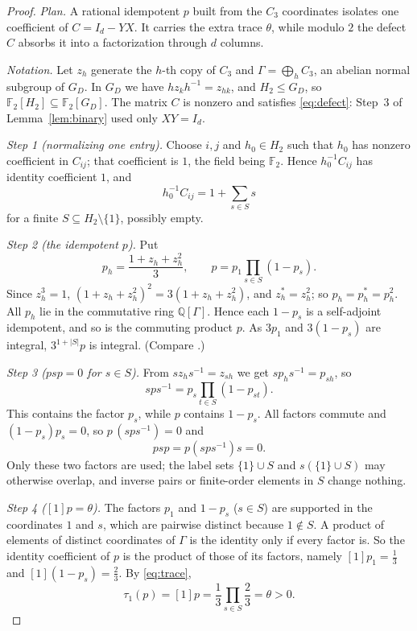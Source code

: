 \documentclass[11pt]{article}
\theoremstyle{remark}
\numberwithin{equation}{section}
\newcommand{\F}{\mathbb F}
\newcommand{\Q}{\mathbb Q}
\begin{document}
\begin{proof}
\emph{Plan.} A rational idempotent $p$ built from the $C_3$ coordinates isolates one coefficient of $C=I_d-YX$. It carries the extra trace $\theta$, while modulo $2$ the defect $C$ absorbs it into a factorization through $d$ columns.

\emph{Notation.} Let $z_h$ generate the $h$-th copy of $C_3$ and $\Gamma=\bigoplus_hC_3$, an abelian normal subgroup of $G_D$. In $G_D$ we have $hz_kh^{-1}=z_{hk}$, and $H_2\le G_D$, so $\F_2[H_2]\subseteq\F_2[G_D]$. The matrix $C$ is nonzero and satisfies \eqref{eq:defect}: Step~3 of Lemma~\ref{lem:binary} used only $XY=I_d$.

\emph{Step 1 (normalizing one entry).} Choose $i,j$ and $h_0\in H_2$ such that $h_0$ has nonzero coefficient in $C_{ij}$; that coefficient is $1$, the field being $\F_2$. Hence $h_0^{-1}C_{ij}$ has identity coefficient $1$, and
\begin{equation}\label{eq:support}
 h_0^{-1}C_{ij}=1+\sum_{s\in S}s
\end{equation}
for a finite $S\subseteq H_2\setminus\{1\}$, possibly empty.

\emph{Step 2 (the idempotent $p$).} Put
\[
 p_h=\frac{1+z_h+z_h^2}{3},\qquad p=p_1\prod_{s\in S}(1-p_s).
\]
Since $z_h^3=1$, $(1+z_h+z_h^2)^2=3(1+z_h+z_h^2)$, and $z_h^*=z_h^2$; so $p_h=p_h^*=p_h^2$. All $p_h$ lie in the commutative ring $\Q[\Gamma]$. Hence each $1-p_s$ is a self-adjoint idempotent, and so is the commuting product $p$. As $3p_1$ and $3(1-p_s)$ are integral, $3^{1+|S|}p$ is integral. (Compare \cite[Lemmas 3.1 and 3.4]{DicksSchick2002}.)

\emph{Step 3 ($psp=0$ for $s\in S$).} From $sz_hs^{-1}=z_{sh}$ we get $sp_hs^{-1}=p_{sh}$, so
\[
 sps^{-1}=p_s\prod_{t\in S}(1-p_{st}).
\]
This contains the factor $p_s$, while $p$ contains $1-p_s$. All factors commute and $(1-p_s)p_s=0$, so $p\,(sps^{-1})=0$ and
\begin{equation}\label{eq:separation}
 psp=p(sps^{-1})s=0.
\end{equation}
Only these two factors are used; the label sets $\{1\}\cup S$ and $s(\{1\}\cup S)$ may otherwise overlap, and inverse pairs or finite-order elements in $S$ change nothing.

\emph{Step 4 ($[1]p=\theta$).} The factors $p_1$ and $1-p_s$ ($s\in S$) are supported in the coordinates $1$ and $s$, which are pairwise distinct because $1\notin S$. A product of elements of distinct coordinates of $\Gamma$ is the identity only if every factor is. So the identity coefficient of $p$ is the product of those of its factors, namely $[1]p_1=\frac13$ and $[1](1-p_s)=\frac23$. By \eqref{eq:trace},
\begin{equation}\label{eq:theta}
 \tau_1(p)=[1]p=\frac13\prod_{s\in S}\frac23=\theta>0.
\end{equation}


\end{proof}
\end{document}
